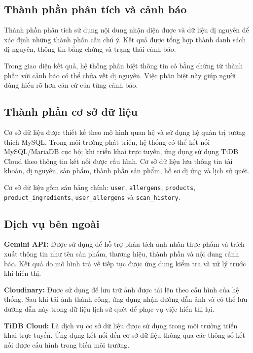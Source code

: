 \subsection{Thành phần phân tích và cảnh báo}

Thành phần phân tích sử dụng nội dung nhận diện được và dữ liệu dị nguyên để xác định những thành phần cần chú ý. Kết quả được tổng hợp thành danh sách dị nguyên, thông tin bằng chứng và trạng thái cảnh báo.

Trong giao diện kết quả, hệ thống phân biệt thông tin có bằng chứng từ thành phần với cảnh báo có thể chứa vết dị nguyên. Việc phân biệt này giúp người dùng hiểu rõ hơn căn cứ của từng cảnh báo.

\subsection{Thành phần cơ sở dữ liệu}

Cơ sở dữ liệu được thiết kế theo mô hình quan hệ và sử dụng hệ quản trị tương thích MySQL. Trong môi trường phát triển, hệ thống có thể kết nối MySQL/MariaDB cục bộ; khi triển khai trực tuyến, ứng dụng sử dụng TiDB Cloud theo thông tin kết nối được cấu hình. Cơ sở dữ liệu lưu thông tin tài khoản, dị nguyên, sản phẩm, thành phần sản phẩm, hồ sơ dị ứng và lịch sử quét.

Cơ sở dữ liệu gồm sáu bảng chính: \texttt{user}, \texttt{allergens}, \texttt{products}, \texttt{product\_ingredients}, \texttt{user\_allergens} và \texttt{scan\_history}.

\subsection{Dịch vụ bên ngoài}

\textbf{Gemini API:} Được sử dụng để hỗ trợ phân tích ảnh nhãn thực phẩm và trích xuất thông tin như tên sản phẩm, thương hiệu, thành phần và nội dung cảnh báo. Kết quả do mô hình trả về tiếp tục được ứng dụng kiểm tra và xử lý trước khi hiển thị.

\textbf{Cloudinary:} Được sử dụng để lưu trữ ảnh được tải lên theo cấu hình của hệ thống. Sau khi tải ảnh thành công, ứng dụng nhận đường dẫn ảnh và có thể lưu đường dẫn này trong dữ liệu lịch sử quét để phục vụ việc hiển thị lại.

\textbf{TiDB Cloud:} Là dịch vụ cơ sở dữ liệu được sử dụng trong môi trường triển khai trực tuyến. Ứng dụng kết nối đến cơ sở dữ liệu thông qua các thông số kết nối được cấu hình trong biến môi trường.

